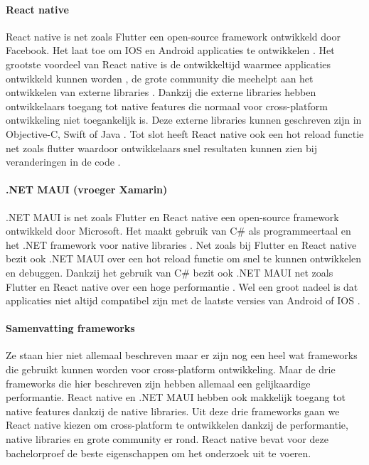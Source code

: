 \paragraph{React native}
React native is net zoals Flutter een open-source framework ontwikkeld door Facebook. 
Het laat toe om IOS en Android applicaties te ontwikkelen \autocite{Terekhov2022}. 
Het grootste voordeel van React native is de ontwikkeltijd waarmee applicaties ontwikkeld 
kunnen worden \autocite{Terekhov2022}, de grote community die meehelpt aan het ontwikkelen 
van externe libraries \autocite{Okeke2022a}. Dankzij die externe libraries hebben ontwikkelaars 
toegang tot native features die normaal voor cross-platform ontwikkeling niet toegankelijk is. 
Deze externe libraries kunnen geschreven zijn in Objective-C, Swift of Java \autocite{Okeke2022a}. 
Tot slot heeft React native ook een hot reload functie net zoals flutter waardoor ontwikkelaars 
snel resultaten kunnen zien bij veranderingen in de code \autocite{Terekhov2022}.

\paragraph{.NET MAUI (vroeger Xamarin)}
.NET MAUI is net zoals Flutter en React native een open-source framework ontwikkeld door 
Microsoft. Het maakt gebruik van C\# als programmeertaal en het .NET framework voor 
native libraries \autocite{Sakovich22023}. Net zoals bij Flutter en React native bezit 
ook .NET MAUI over een hot reload functie om snel te kunnen ontwikkelen en debuggen. 
Dankzij het gebruik van C\# bezit ook .NET MAUI net zoals Flutter en React native over 
een hoge performantie \autocite{Okeke2022a}. Wel een groot nadeel is dat applicaties 
niet altijd compatibel zijn met de laatste versies van Android of IOS \autocite{Terekhov2022}.

\paragraph{Samenvatting frameworks}
Ze staan hier niet allemaal beschreven maar er zijn nog een heel wat frameworks die 
gebruikt kunnen worden voor cross-platform ontwikkeling. Maar de drie frameworks die 
hier beschreven zijn hebben allemaal een gelijkaardige performantie. React native en 
.NET MAUI hebben ook makkelijk toegang tot native features dankzij de native libraries. 
Uit deze drie frameworks gaan we React native kiezen om cross-platform te ontwikkelen 
dankzij de performantie, native libraries en grote community er rond. React native 
bevat voor deze bachelorproef de beste eigenschappen om het onderzoek uit te voeren.

